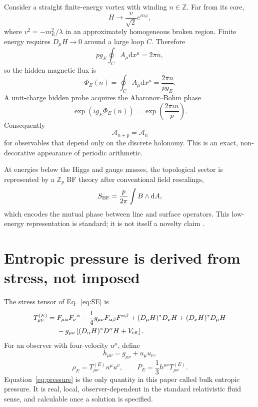 \documentclass[11pt]{article}
\newcommand{\dd}{\mathrm{d}}
\begin{document}
Consider a straight finite-energy vortex with winding $n\in\mathbb Z$.  Far from its core,
\begin{equation}
H\longrightarrow \frac{v}{\sqrt2}e^{in\varphi},
\end{equation}
where $v^2=-m_E^2/\lambda$ in an approximately homogeneous broken region.  Finite energy requires $D_\mu H\to0$ around a large loop $C$.  Therefore
\begin{equation}
 p g_E\oint_C A_\mu\dd x^\mu=2\pi n,
\end{equation}
so the hidden magnetic flux is
\begin{equation}
\boxed{
\Phi_E(n)=\oint_C A_\mu\dd x^\mu
=\frac{2\pi n}{p g_E}.
}
\label{eq:flux}
\end{equation}
A unit-charge hidden probe acquires the Aharonov--Bohm phase
\begin{equation}
\boxed{
\exp\left(i g_E\Phi_E(n)\right)
=\exp\left(\frac{2\pi i n}{p}\right).
}
\label{eq:AB}
\end{equation}
Consequently
\begin{equation}
\mathcal A_{n+p}=\mathcal A_n
\end{equation}
for observables that depend only on the discrete holonomy.  This is an exact, non-decorative appearance of periodic arithmetic.

At energies below the Higgs and gauge masses, the topological sector is represented by a $\mathbb Z_p$ BF theory after conventional field rescalings,
\begin{equation}
S_{\rm BF}=\frac{p}{2\pi}\int B\wedge \dd A,
\label{eq:BF}
\end{equation}
which encodes the mutual phase between line and surface operators.  This low-energy representation is standard; it is not itself a novelty claim \citep{KapustinSeiberg2014,GaiottoEtAl2015}.

\section{Entropic pressure is derived from stress, not imposed}

The stress tensor of Eq.~\eqref{eq:SE} is
\begin{align}
T^{(E)}_{\mu\nu}={}&F_{\mu\alpha}F_\nu{}^\alpha
-\frac14 g_{\mu\nu}F_{\alpha\beta}F^{\alpha\beta}
+(D_\mu H)^\ast D_\nu H+(D_\nu H)^\ast D_\mu H\nonumber\\
&-g_{\mu\nu}\left[(D_\alpha H)^\ast D^\alpha H+V_{\rm eff}\right].
\end{align}
For an observer with four-velocity $u^\mu$, define
\begin{equation}
h_{\mu\nu}=g_{\mu\nu}+u_\mu u_\nu,
\end{equation}
\begin{equation}
\boxed{
\rho_E=T^{(E)}_{\mu\nu}u^\mu u^\nu,
\qquad
P_E=\frac13 h^{\mu\nu}T^{(E)}_{\mu\nu}.
}
\label{eq:pressure}
\end{equation}
Equation~\eqref{eq:pressure} is the only quantity in this paper called bulk entropic pressure.  It is real, local, observer-dependent in the standard relativistic fluid sense, and calculable once a solution is specified.
\end{document}
